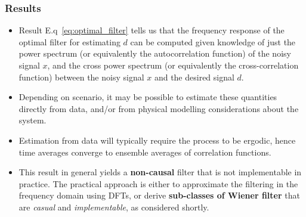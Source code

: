 \documentclass[12pt]{article}
\begin{document}
\subsubsection{Results}
\begin{itemize}
    \item Result E.q~\ref{eq:optimal_filter} tells us that the frequency response of the optimal filter for estimating $d$ can be computed given knowledge of just the power spectrum (or equivalently the autocorrelation function) of the noisy signal $x$, and the cross power spectrum (or equivalently the cross-correlation function) between the noisy signal $x$ and the desired signal $d$.
    \item Depending on scenario, it may be possible to estimate these quantities directly from data, and/or from physical modelling considerations about the system.
    \item Estimation from data will typically require the process to be ergodic, hence time averages converge to ensemble averages of correlation functions.
    \item This result in general yields a \textbf{non-causal} filter that is not implementable in practice. The practical approach is either to approximate the filtering in the frequency domain using DFTs, or derive \textbf{sub-classes of Wiener filter} that are \textit{casual} and \textit{implementable}, as considered shortly.
\end{itemize}
\end{document}
